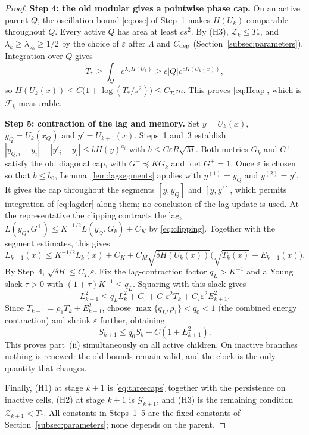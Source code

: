 \documentclass[11pt]{article}
\theoremstyle{definition}
\theoremstyle{remark}
\numberwithin{equation}{section}
\newcommand{\F}{\mathcal F}
\begin{document}
\begin{proof}
\textbf{Step 4: the old modular gives a pointwise phase cap.}
On an active parent $Q$, the oscillation bound \eqref{eq:osc} of
Step~1 makes $H(U_k)$ comparable throughout $Q$.
Every active $Q$ has area at least $cs^2$. By (H3),
$\mathcal Z_k\le T_*$, and $\lambda_k\ge\lambda_{J_0}\ge1/2$ by the
choice of $\varepsilon$ after $\Lambda$ and $C_{\rm dep}$
(Section~\ref{subsec:parameters}). Integration over $Q$ gives
\[
 T_*\ge\int_Qe^{\lambda_kH(U_k)}
 \ge c|Q|e^{cH(U_k(x))},
\]
so
$H(U_k(x))\le C\bigl(1+\log(T_*/s^2)\bigr)\le C_{T_*}m$.
This proves \eqref{eq:Hcap}, which is $\F_k$-measurable.

\textbf{Step 5: contraction of the lag and memory.}
Set $y=U_k(x)$, $y_Q=U_k(x_Q)$ and
$y'=U_{k+1}(x)$.  Steps~1 and~3 establish
$|y_{Q,i}-y_i|+|y'_i-y_i|\le
bH(y)^{a_i}$ with $b\le C\varepsilon R\sqrt M$.
Both metrics $G_k$ and $G^+$ satisfy the old diagonal cap,
with $G^+\preceq KG_k$ and $\det G^+=1$. Once $\varepsilon$ is
chosen so that $b\le b_0$, Lemma~\ref{lem:lagsegments} applies with
$y^{(1)}=y_Q$ and $y^{(2)}=y'$. It gives the cap throughout
the segments $[y,y_Q]$ and $[y,y']$, which permits integration of
\eqref{eq:lagder} along them; no conclusion of the lag
update is used. At the representative the clipping contracts the
lag, $L(y_Q,G^+)\le K^{-1/2}L(y_Q,G_k)+C_K$ by \eqref{eq:clipping}.
Together with the segment estimates, this gives
\[
 L_{k+1}(x)
 \le K^{-1/2}L_k(x)+C_K
    +C_M\sqrt{\delta H(U_k(x))}
             \bigl(\sqrt{T_k(x)}+E_{k+1}(x)\bigr).
\]
By Step~4, $\sqrt{\delta H}\le C_{T_*}\varepsilon$.
\label{not:qL}
Fix the lag-contraction factor $q_L>K^{-1}$ and a Young slack
$\tau>0$ with $(1+\tau)K^{-1}\le q_L$. Squaring with this slack gives
\[
 L_{k+1}^2\le q_LL_k^2+C_\tau+C_\tau\varepsilon^2T_k
                  +C_\tau\varepsilon^2E_{k+1}^2.
\]
Since $T_{k+1}=\rho_1T_k+E_{k+1}^2$, choose
$\max\{q_L,\rho_1\}<q_0<1$ (the combined energy contraction)
and shrink $\varepsilon$
further, obtaining
\[
 S_{k+1}\le q_0S_k+C(1+E_{k+1}^2).
\]
This proves part~(ii) simultaneously on all active children.
On inactive branches nothing is renewed: the old bounds remain
valid, and the clock is the only quantity that changes.

Finally, (H1) at stage $k+1$ is \eqref{eq:threecaps} together with
the persistence on inactive cells, (H2) at stage $k+1$ is
$\mathcal G_{k+1}$, and (H3) is the remaining condition
$\mathcal Z_{k+1}<T_*$. All constants in Steps~1--5 are the fixed
constants of Section~\ref{subsec:parameters}; none depends on the
parent.
\end{proof}
\end{document}
